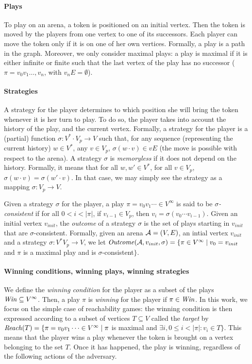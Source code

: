 \paragraph{Plays} To play on an arena, a token is positioned on an initial vertex. Then the token is moved by 
the players from one vertex to 
one of its successors. Each player can move the token only if it is on one of her own vertices. Formally, a play is
a path in the graph. Moreover, we only consider maximal plays:  a 
play is maximal if it is either infinite or finite such that the last vertex of the play has no successor
($\pi=v_0v_1\dots, v_n$, with $v_{n}E=\emptyset$).

\paragraph{Strategies}%
A strategy for the player determines
to which position she will bring the token whenever it is her turn to play.
To do so, the player takes into account the history of the play, and the current
vertex.
Formally, a strategy for the player is a (partial) function
$\sigma:  V^*\cdot V_p \rightarrow V$ such that, for any sequence (representing the
current history) $w\in V^*$, any $v\in V_p$, $\sigma
(w\cdot v)\in vE$ (\ie the move is possible with respect to the arena). 
A strategy $\sigma$ is \emph{memoryless} if it does not depend on the history. Formally, it means
that for all
$w, w'\in V^*$, for all $v\in V_p$, $\sigma(w\cdot v) = \sigma(w'\cdot v)$. In that case, 
we may simply see the strategy as a mapping $\sigma: V_p\rightarrow V$.

Given a strategy $\sigma$ for the player, a play $\pi=v_0v_1\cdots \in V^\infty$
 is said to be \emph{$\sigma$-consistent} if for all $0<i<| \pi |$, if $v_{i-1}\in V_p$, then $v_i=\sigma
(v_0\cdots v_{i-1})$. Given an initial
vertex $v_{init}$, the \emph{outcome} of a strategy $\sigma$ is the set of plays starting in $v_{init}$
that are $\sigma$-consistent. Formally, given an arena $\mathcal{A}=(V, E)$, an intial vertex $v_{init}$ and 
a strategy $\sigma: V^*V_p\rightarrow V$, we let $\mathit{Outcome}(\mathcal{A}, v_{init}, \sigma)=\{\pi \in V^\infty 
\mid v_0=v_{init}$ and  $\pi$ is a maximal play and is $\sigma$-consistent$\}$.

\paragraph{Winning conditions, winning plays, winning strategies}
 We define the \emph{winning condition} for the player as a subset of the plays $\mathit{Win} \subseteq V^\infty$.
 Then, a play $\pi$ is \emph{winning} for the player if $\pi\in \mathit{Win}$. In this work, we focus on the simple
 case of reachability games:  the winning condition is then expressed according to a subset of vertices $T\subseteq V$
 called the \emph{target} by $\mathit{Reach}(T)=\{\pi=v_0v_1\cdots \in V^\infty\mid \pi$ is maximal and 
 $\exists i,  0\leq i < |\pi|:  v_i \in T\}$. This means that the player
 wins a play whenever the token is brought on a vertex belonging to the set $T$. Once it has happened, the play
 is winning, regardless of the following actions of the adversary.

